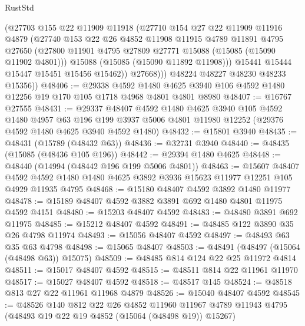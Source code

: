\begin{lexlean}{RustStd}
\begin{coremodule}
              (@27703
                @155
                @22
                @11909
                @11918
                (@27710
                  @154
                  @27
                  @22
                  @11909
                  @11916
                  @4879
                  (@27740
                    @153
                    @22
                    @26
                    @4852
                    @11908
                    @11915
                    @4789
                    @11891
                    @4795
                    @27650
                    (@27800 @11901 @4795 @27809 @27771 @15088 (@15085 (@15090 @11902 @4801)))
                    @15088
                    (@15085 (@15090 @11892 @11908)))
                  @15441
                  @15444
                  @15447
                  @15451
                  @15456
                  @15462))
              @27668)))
        @48224
        @48227
        @48230
        @48233
        @15356))
@48406 := @29338
    @4592
    @1480
    @4625
    @3940
    @106
    @4592
    @1480
    @12256
    @19
    @170
    @105
    @1718
    @4968
    @4801
    @4801
    @8980
@48407 := @16767 @27555
@48431 := @29337
    @48407
    @4592
    @1480
    @4625
    @3940
    @105
    @4592
    @1480
    @4957
    @63
    @196
    @199
    @3937
    @5006
    @4801
    @11980
    @12252
    (@29376 @4592 @1480 @4625 @3940 @4592 @1480)
@48432 := @15801 @3940
@48435 := @48431 (@15789 (@48432 @63))
@48436 := @32731 @3940
@48440 := @48435 (@15085 (@48436 @105 @196))
@48442 := @29394 @1480 @4625
@48448 := @48440 (@14994 (@48442 @196 @199 @5006 @4801))
@48463 := @15607
    @48407
    @4592
    @4592
    @1480
    @1480
    @4625
    @3892
    @3936
    @15623
    @11977
    @12251
    @105
    @4929
    @11935
    @4795
@48468 := @15180 @48407 @4592 @3892 @1480 @11977
@48478 := @15189 @48407 @4592 @3882 @3891 @692 @1480 @4801 @11975 @4592 @4151
@48480 := @15203 @48407 @4592
@48483 := @48480 @3891 @692 @11975
@48485 := @15212 @48407 @4592
@48491 := @48485 @122 @3890 @35 @26 @4798 @11974
@48493 := @15056 @48407 @4592
@48497 := @48493 @63 @35 @63 @4798
@48498 := @15065 @48407
@48503 := @48491 (@48497 (@15064 (@48498 @63)) @15075)
@48509 := @48485 @814 @124 @22 @25 @11972 @4814
@48511 := @15017 @48407 @4592
@48515 := @48511 @814 @22 @11961 @11970
@48517 := @15027 @48407 @4592
@48518 := @48517 @145
@48524 := @48518 @813 @27 @22 @11961 @11968 @4879
@48526 := @15040 @48407 @4592
@48545 := @48526
    @140
    @812
    @22
    @26
    @4852
    @11960
    @11967
    @4789
    @11943
    @4795
    (@48493 @19 @22 @19 @4852 (@15064 (@48498 @19)) @15267)

\end{coremodule}
\end{lexlean}
